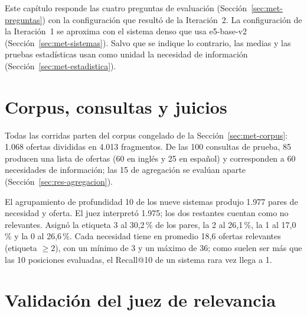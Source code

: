 

Este capítulo responde las cuatro preguntas de evaluación (Sección~\ref{sec:met-preguntas}) con la configuración que resultó de la Iteración~2. La configuración de la Iteración~1 se aproxima con el sistema denso que usa e5-base-v2 (Sección~\ref{sec:met-sistemas}). Salvo que se indique lo contrario, las medias y las pruebas estadísticas usan como unidad la necesidad de información (Sección~\ref{sec:met-estadistica}).

\section{Corpus, consultas y juicios}
\label{sec:res-corpus}

Todas las corridas parten del corpus congelado de la Sección~\ref{sec:met-corpus}: 1.068 ofertas divididas en 4.013 fragmentos. De las 100 consultas de prueba, 85 producen una lista de ofertas (60 en inglés y 25 en español) y corresponden a 60 necesidades de información; las 15 de agregación se evalúan aparte (Sección~\ref{sec:res-agregacion}).

El agrupamiento de profundidad 10 de los nueve sistemas produjo 1.977 pares de necesidad y oferta. El juez interpretó 1.975; los dos restantes cuentan como no relevantes. Asignó la etiqueta 3 al 30,2\,\% de los pares, la 2 al 26,1\,\%, la 1 al 17,0\,\% y la 0 al 26,6\,\%. Cada necesidad tiene en promedio 18,6 ofertas relevantes (etiqueta $\geq 2$), con un mínimo de 3 y un máximo de 36; como suelen ser más que las 10 posiciones evaluadas, el Recall@10 de un sistema rara vez llega a 1.

\section{Validación del juez de relevancia}
\label{sec:res-juez}

